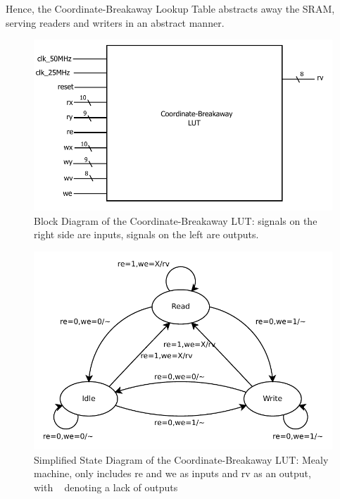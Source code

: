 \documentclass{article}
\begin{document}
Hence, the Coordinate-Breakaway Lookup Table abstracts away the SRAM,
serving readers and writers in an abstract manner.


\begin{figure}[h!]
  \centering
    \includegraphics[width=\textwidth]{block_diagrams/clut.pdf}
  \caption{Block Diagram of the Coordinate-Breakaway LUT: signals on
    the right side are inputs, signals on the left are outputs.}
\end{figure}

\begin{figure}[h!]
  \centering
    \includegraphics[width=\textwidth]{state_diagrams/clut.pdf}
  \caption{Simplified State Diagram of the Coordinate-Breakaway LUT:
    Mealy machine, only includes re and we as inputs and rv as an
    output, with ~ denoting a lack of outputs}
\end{figure}
\end{document}
